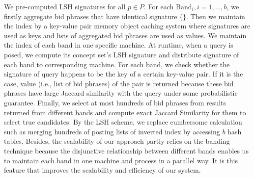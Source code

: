 We pre-computed LSH signatures for all $p\in{}P$.%
For each $\text{Band}_{i},i=1,\ldots,b$, we firstly aggregate bid
phrases that have identical signature $\{\}$.
Then we maintain the index by a key-value pair memory object caching
system where signatures are used as keys and lists of
aggregated bid phrases are used as values.
We maintain the index of each band in one specific machine.
At runtime, when a query is posed, we compute its concept set's LSH
signature and distribute signature of each band to corresponding machine.
For each band, we check whether the signature of query happens to be
the key of a certain key-value pair.
If it is the case, value (i.e., list of bid phrases) of the pair is
returned because these bid phrases have large Jaccard similarity with
the query under some probabilistic guarantee.
Finally, we select at most hundreds of bid phrases from results
returned from different bands and compute exact Jaccard Similarity for
them to select true candidates.
By the LSH scheme, we replace cumbersome calculation such as merging
hundreds of posting lists of inverted index by %
accessing $b$ hash tables.
Besides, the scalability of our approach partly relies on the banding
technique because the disjunctive relationship between different bands enables
us to maintain each band in one machine and process in a parallel way.
It is this feature that improves the scalability and efficiency of our
system.
